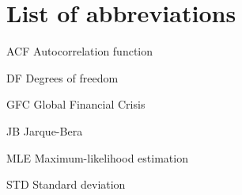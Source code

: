 \section*{List of abbreviations}

\begin{abbrv}
\item[ACF] Autocorrelation function
\item[DF] Degrees of freedom
\item[GFC] Global Financial Crisis
\item[JB] Jarque-Bera
\item[MLE] Maximum-likelihood estimation
\item[STD] Standard deviation
\
\end{abbrv}
